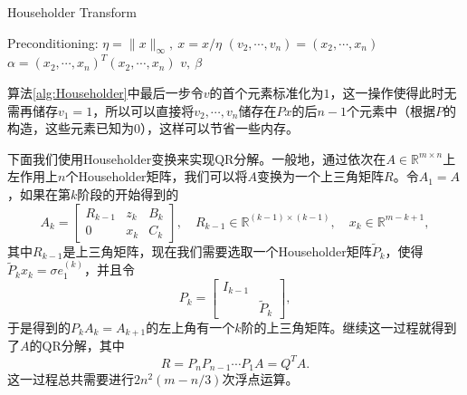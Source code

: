 \documentclass[a4paper,10pt]{ctexart}
\begin{document}
\begin{algorithm}[htbp]
    \caption{Householder Transform}\label{alg:Householder}
    Preconditioning: $ \eta = \| x \|_\infty, \ x = x / \eta $\;
    $ (v_2,\cdots ,v_n) = (x_2,\cdots,x_n) $\;
    $ \alpha = (x_2,\cdots ,x_n)^T (x_2,\cdots ,x_n) $\;
    \Return $ v,\ \beta $\;
\end{algorithm}

算法\ref{alg:Householder}中最后一步令$ v $的首个元素标准化为$ 1 $，这一操作使得此时无需再储存$ v_1=1 $，所以可以直接将$ v_2,\cdots ,v_n $储存在$ Px $的后$ n-1 $个元素中（根据$ P $的构造，这些元素已知为0），这样可以节省一些内存。

下面我们使用Householder变换来实现QR分解。一般地，通过依次在$ A\in \mathbb{R}^{m\times n} $上左作用上$ n $个Householder矩阵，我们可以将$ A $变换为一个上三角矩阵$ R $。令$ A_1 = A $，如果在第$ k $阶段的开始得到的
\[
    A_k = 
    \begin{bmatrix}
        R_{k-1} & z_k & B_k\\
        0 & x_k & C_k
    \end{bmatrix},\quad R_{k-1}\in \mathbb{R}^{(k-1)\times (k-1)},\quad x_k\in \mathbb{R}^{m-k+1},
\]
其中$ R_{k-1} $是上三角矩阵，现在我们需要选取一个Householder矩阵$ \tilde{P}_k $，使得$ \tilde{P}_k x_k = \sigma e_1^{(k)} $，并且令
\[
    P_k = 
    \begin{bmatrix} 
         I_{k-1} & \\
         & \tilde{P}_k
    \end{bmatrix},
\]
于是得到的$ P_k A_k = A_{k+1} $的左上角有一个$ k $阶的上三角矩阵。继续这一过程就得到了$ A $的QR分解，其中
\begin{equation}
    R = P_n P_{n-1}\cdots P_1 A = Q^T A.
\end{equation}
这一过程总共需要进行$ 2n^2(m-n / 3) $次浮点运算。
\end{document}
